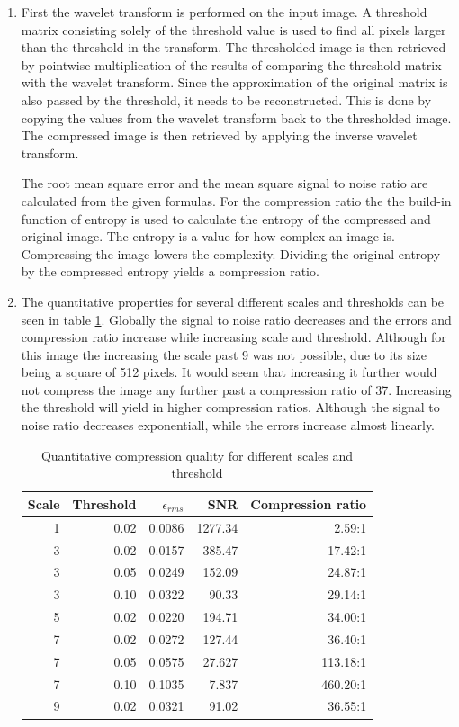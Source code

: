 \documentclass[a4paper]{article}
\newcounter{exerciseCount}
\newcommand{\exercise}[1]{\addtocounter{exerciseCount}{1} \noindent \medskip {\large \textsf{\textbf{Exercise \arabic{exerciseCount} \--- #1}}} \par}
\begin{document}
\exercise{Image Compression}
\begin{enumerate}
\item
First the wavelet transform is performed on the input image.
A threshold matrix consisting solely of the threshold value is used to find all pixels larger than the threshold in the transform.
The thresholded image is then retrieved by pointwise multiplication of the results of comparing the threshold matrix with the wavelet transform.
Since the approximation of the original matrix is also passed by the threshold, it needs to be reconstructed.
This is done by copying the values from the wavelet transform back to the thresholded image.
The compressed image is then retrieved by applying the inverse wavelet transform.

\noindent The root mean square error and the mean square signal to noise ratio are calculated from the given formulas.
For the compression ratio the the build-in function of entropy is used to calculate the entropy of the compressed and
original image.
The entropy is a value for how complex an image is. Compressing the image lowers the complexity.
Dividing the original entropy by the compressed entropy yields a compression ratio.


\item
The quantitative properties for several different scales and thresholds can be seen in table \ref{tab:results}.
Globally the signal to noise ratio decreases and the errors and compression ratio increase while increasing scale and threshold.
Although for this image the increasing the scale past 9 was not possible, due to its size being a square of 512 pixels.
It would seem that increasing it further would not compress the image any further past a compression ratio of 37.
Increasing the threshold will yield in higher compression ratios. Although the signal to noise ratio decreases exponentiall, while
the errors increase almost linearly.
\begin{table}[H]
\centering
\begin{tabular}{r|r|r|r|r}
 \textbf{Scale} & \textbf{Threshold} & \textbf{$\epsilon_{rms}$} & \textbf{SNR} & \textbf{Compression ratio}\\
 \hline
 1 & 0.02 & 0.0086 & 1277.34 & 2.59:1 \\
 3 & 0.02 & 0.0157 &  385.47 & 17.42:1 \\
 3 & 0.05 & 0.0249 & 152.09  & 24.87:1 \\
 3 & 0.10 & 0.0322 & 90.33  & 29.14:1 \\
 5 & 0.02 & 0.0220 & 194.71  & 34.00:1 \\
 7 & 0.02 & 0.0272 & 127.44  & 36.40:1 \\
 7 & 0.05 & 0.0575 & 27.627  & 113.18:1 \\
 7 & 0.10 & 0.1035 & 7.837  & 460.20:1 \\
 9 & 0.02 & 0.0321 & 91.02   & 36.55:1 \\
\end{tabular}
\caption{Quantitative compression quality for different scales and threshold}
\label{tab:results}
\end{table}


\end{enumerate}
\end{document}
